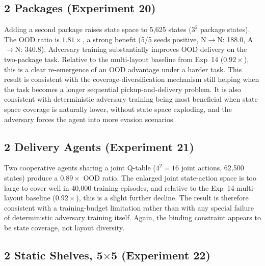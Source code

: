 \documentclass[sigconf]{aamas}
\begin{document}
\subsection{2 Packages (Experiment 20)}

Adding a second package raises state space to 5{,}625 states ($3^2$ package
states). The OOD ratio is $1.81\times$, a strong benefit (5/5 seeds
positive, N$\to$N: 188.0, A$\to$N: 340.8). Adversary training substantially
improves OOD delivery on the two-package task. Relative to the multi-layout
baseline from Exp~14 ($0.92\times$), this is a clear re-emergence of an OOD
advantage under a harder task. This result is consistent with the coverage-diversification mechanism still helping when the task
becomes a longer sequential pickup-and-delivery problem. It is also consistent with deterministic adversary training being most beneficial when state space coverage is naturally lower, without state space exploding, and the adversary forces the agent into more evasion scenarios.

\subsection{2 Delivery Agents (Experiment 21)}

Two cooperative agents sharing a joint Q-table ($4^2 = 16$ joint actions,
62{,}500 states) produce a $0.89\times$ OOD ratio. The enlarged joint
state-action space is too large to cover well in 40{,}000 training episodes,
and relative to the Exp~14 multi-layout baseline ($0.92\times$), this is a slight further decline.
The result is therefore consistent with a training-budget limitation rather
than with any special failure of deterministic adversary training itself.
Again, the binding constraint appears to be state coverage, not layout
diversity.
\subsection{2 Static Shelves, 5$\times$5 (Experiment 22)}
\end{document}
